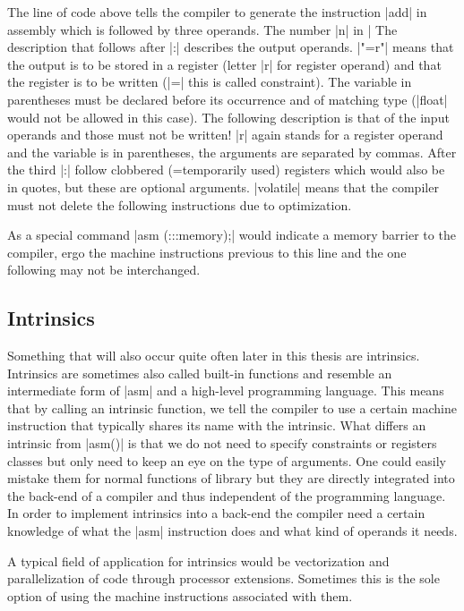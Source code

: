 The line of code above tells the compiler to generate the instruction |add| in assembly which is followed by three operands.
The number |n| in |%
The description that follows after |:| describes the output operands.
|"=r"| means that the output is to be stored in a register (letter |r| for register operand) and that the register is to be written (|=| this is called constraint).
The variable in parentheses must be declared before its occurrence and of matching type (|float| would not be allowed in this case).
The following description is that of the input operands and those must not be written!
|r| again stands for a register operand and the variable is in parentheses, the arguments are separated by commas.
After the third |:| follow clobbered (=temporarily used) registers which would also be in quotes, but these are optional arguments.
|volatile| means that the compiler must not delete the following instructions due to optimization.

As a special command |asm (:::memory);| would indicate a memory barrier to the compiler, ergo the machine instructions previous to this line and the one following may not be interchanged.

\subsection{Intrinsics}
Something that will also occur quite often later in this thesis are intrinsics.
Intrinsics are sometimes also called built-in functions and resemble an intermediate form of |asm| and a high-level programming language.
This means that by calling an intrinsic function, we tell the compiler to use a certain machine instruction that typically shares its name with the intrinsic.
What differs an intrinsic from |asm()| is that we do not need to specify constraints or registers classes but only need to keep an eye on the type of arguments.
One could easily mistake them for normal functions of library but they are directly integrated into the back-end of a compiler and thus independent of the programming language.
In order to implement intrinsics into a back-end the compiler need a certain knowledge of what the |asm| instruction does and what kind of operands it needs.

A typical field of application for intrinsics would be vectorization and parallelization of code through processor extensions.
Sometimes this is the sole option of using the machine instructions associated with them.

